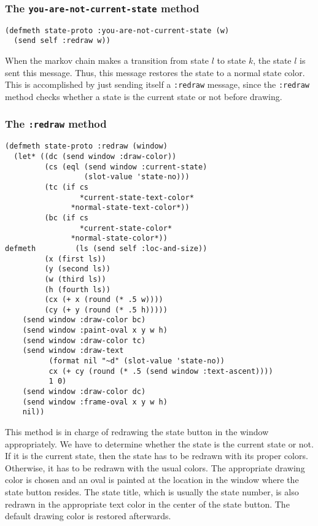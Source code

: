 \subsubsection{The {\tt you-are-not-current-state} method}
\label{subsubsec:you-are-not-current-state}
\begin{verbatim}
(defmeth state-proto :you-are-not-current-state (w)
  (send self :redraw w))
\end{verbatim}
When the markov chain makes a transition from state $l$ to state $k$,
the state $l$ is sent this message.  Thus, this message restores the
state to a normal state color.  This is accomplished by just sending
itself a {\tt :redraw} message, since the {\tt :redraw} method checks
whether a state is the current state or not before drawing.

\subsubsection{The {\tt :redraw} method}
\label{subsubsec:state-redraw}
\begin{verbatim}
(defmeth state-proto :redraw (window)
  (let* ((dc (send window :draw-color))
         (cs (eql (send window :current-state) 
                  (slot-value 'state-no)))
         (tc (if cs
                 *current-state-text-color*
               *normal-state-text-color*))
         (bc (if cs
                 *current-state-color*
               *normal-state-color*))
defmeth         (ls (send self :loc-and-size))
         (x (first ls))
         (y (second ls))
         (w (third ls))
         (h (fourth ls))
         (cx (+ x (round (* .5 w))))
         (cy (+ y (round (* .5 h)))))
    (send window :draw-color bc)
    (send window :paint-oval x y w h)
    (send window :draw-color tc)
    (send window :draw-text 
          (format nil "~d" (slot-value 'state-no))
          cx (+ cy (round (* .5 (send window :text-ascent))))
          1 0)
    (send window :draw-color dc)
    (send window :frame-oval x y w h)
    nil))
\end{verbatim}
This method is in charge of redrawing the state button in the window
appropriately. We have to determine whether the state is the current
state or not.  If it is the current state, then the state has to be
redrawn with its proper colors. Otherwise, it has to be redrawn with
the usual colors.  The appropriate drawing color is chosen and an oval
is painted at the location in the window where the state button
resides. The state title, which is usually the state number,  is also
redrawn in the appropriate text color in the center of the state
button.  The default drawing color is restored afterwards.  


